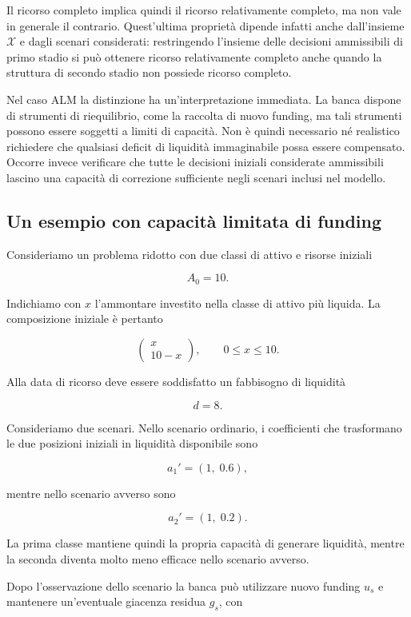 Il ricorso completo implica quindi il ricorso relativamente completo, ma non
vale in generale il contrario. Quest'ultima propriet\`a dipende infatti anche
dall'insieme $\mathcal X$ e dagli scenari considerati: restringendo l'insieme
delle decisioni ammissibili di primo stadio si pu\`o ottenere ricorso
relativamente completo anche quando la struttura di secondo stadio non
possiede ricorso completo.

Nel caso ALM la distinzione ha un'interpretazione immediata. La banca dispone
di strumenti di riequilibrio, come la raccolta di nuovo funding, ma tali
strumenti possono essere soggetti a limiti di capacit\`a. Non \`e quindi
necessario n\'e realistico richiedere che qualsiasi deficit di liquidit\`a
immaginabile possa essere compensato. Occorre invece verificare che tutte le
decisioni iniziali considerate ammissibili lascino una capacit\`a di
correzione sufficiente negli scenari inclusi nel modello.

\subsection{Un esempio con capacit\`a limitata di funding}

Consideriamo un problema ridotto con due classi di attivo e risorse iniziali

\[
A_0=10.
\]

Indichiamo con $x$ l'ammontare investito nella classe di attivo pi\`u liquida.
La composizione iniziale \`e pertanto

\[
\begin{pmatrix}
x\\
10-x
\end{pmatrix},
\qquad
0\leq x\leq10.
\]

Alla data di ricorso deve essere soddisfatto un fabbisogno di liquidit\`a

\[
d=8.
\]

Consideriamo due scenari. Nello scenario ordinario, i coefficienti che
trasformano le due posizioni iniziali in liquidit\`a disponibile sono

\[
a_1'
=
(1,\;0.6),
\]

mentre nello scenario avverso sono

\[
a_2'
=
(1,\;0.2).
\]

La prima classe mantiene quindi la propria capacit\`a di generare liquidit\`a,
mentre la seconda diventa molto meno efficace nello scenario avverso.

Dopo l'osservazione dello scenario la banca pu\`o utilizzare nuovo funding
$u_s$ e mantenere un'eventuale giacenza residua $g_s$, con

